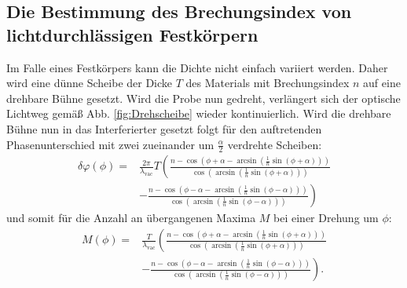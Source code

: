 \subsection{Die Bestimmung des Brechungsindex von lichtdurchlässigen Festkörpern}
Im Falle eines Festkörpers kann die Dichte nicht einfach variiert werden. Daher wird eine dünne Scheibe der Dicke $T$ des Materials mit Brechungsindex $n$ auf eine drehbare Bühne gesetzt. Wird die Probe nun gedreht, verlängert sich der optische Lichtweg gemäß Abb. \ref{fig:Drehscheibe} wieder kontinuierlich. Wird die drehbare Bühne nun in das Interferierter gesetzt folgt für den auftretenden Phasenunterschied mit zwei zueinander um $\frac{\alpha}{2}$ verdrehte Scheiben:
\begin{equation}
\begin{split}
\delta\varphi(\phi) = & \frac{2 \pi}{\lambda_\text{vac}} T \left( \frac{n - \cos\left(\phi+\alpha - \arcsin\left(\frac{1}{n} \sin(\phi+\alpha)\right)\right)}{\cos\left(\arcsin\left(\frac{1}{n} \sin(\phi+\alpha)\right)\right)} \right. \\
& \left. - \frac{n - \cos\left(\phi-\alpha - \arcsin\left(\frac{1}{n} \sin(\phi-\alpha)\right)\right)}{\cos\left(\arcsin\left(\frac{1}{n} \sin(\phi-\alpha)\right)\right)} \right)  \label{eq:phi}
\end{split}
\end{equation}
und somit für die Anzahl an übergangenen Maxima $M$ bei einer Drehung um $\phi$:
\begin{equation}
\begin{split}
M(\phi) = & \frac{T}{\lambda_\text{vac}} \left( \frac{n - \cos\left(\phi+\alpha - \arcsin\left(\frac{1}{n} \sin(\phi+\alpha)\right)\right)}{\cos\left(\arcsin\left(\frac{1}{n} \sin(\phi+\alpha)\right)\right)} \right. \\
& \left. - \frac{n - \cos\left(\phi-\alpha - \arcsin\left(\frac{1}{n} \sin(\phi-\alpha)\right)\right)}{\cos\left(\arcsin\left(\frac{1}{n} \sin(\phi-\alpha)\right)\right)} \right) \text{.} \label{eq:Mglas}
\end{split} 
\end{equation}





